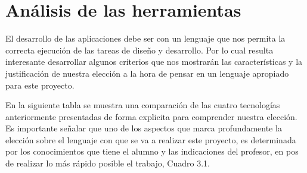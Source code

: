 \documentclass[a4paper,12pt,openany,oneside]{book}
\begin{document}


\section{Análisis de las herramientas}
El desarrollo de las aplicaciones debe ser con un lenguaje que nos permita la correcta ejecución de las tareas de diseño y desarrollo. Por lo cual resulta interesante desarrollar algunos criterios que nos mostrarán las características y la justificación de nuestra elección a la hora de pensar en un lenguaje apropiado para este proyecto.

En la siguiente tabla se muestra una comparación de las cuatro tecnologías anteriormente presentadas de forma explicita para comprender nuestra elección. Es importante señalar que uno de los aspectos que marca profundamente la elección sobre el lenguaje con que se va a realizar este proyecto, es determinada por los conocimientos que tiene el alumno y las indicaciones del profesor, en pos de realizar lo más rápido posible el trabajo, Cuadro 3.1. 
\end{document}
